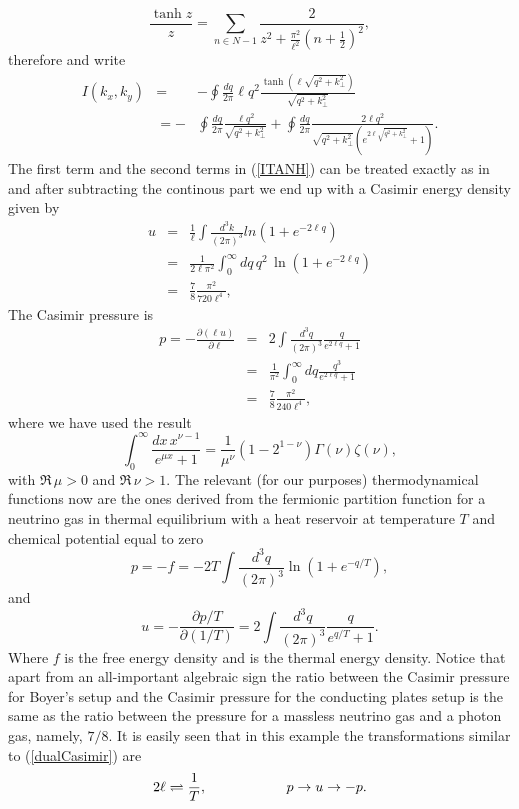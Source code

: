 \documentclass[a4paper,12pt]{article}
\begin{document}
%
\begin{equation}
\frac{\tanh z}{z}=\sum_{n\in N-1}\frac{2}{z^2+\frac{\pi^2}{\ell^2}\left(n+\frac{1}{2}\right)^2},
\end{equation}
%
therefore
%
and write
%
\begin{eqnarray}\label{ITANH}
I(k_x,k_y)& = & -\oint\frac{dq}{2\pi}\ell q^2\frac{\tanh{\left(\ell\sqrt{q^2+k_\bot^2}\right)}}{\sqrt{q^2+k_\bot^2}} \nonumber \\ 
& = -&\oint\frac{dq}{2\pi}\frac{\ell q^2}{\sqrt{q^2+k_\bot^2}}
+\oint\frac{dq}{2\pi}\frac{2\ell q^2}{\sqrt{q^2+k_\bot^2}\left(e^{2\ell\sqrt{q^2+k_\bot^2}}+1 \right)}.
\end{eqnarray}
%
The first term and the second terms in (\ref{ITANH}) can be treated exactly as in \cite{Fukushima&Ohta2001} and after subtracting the continous part we end up with a Casimir energy density given by
%
\begin{eqnarray}
u &=&\frac{1}{\ell}\int \frac{d^3k}{\left(2\pi\right)^3}ln\left(1+e^{-2\ell q}\right)\\ \nonumber
&=&\frac{1}{2\ell\pi^2}\int_0^\infty dq\,q^2\,\ln\left(1+e^{-2\ell q}\right)\\ \nonumber
&=& \frac{7}{8}\frac{\pi^2}{720\ell^4},
\end{eqnarray}
%
The Casimir pressure is
%
\begin{eqnarray}
p=-\frac{\partial\left(\ell u\right)}{\partial\ell}&=& 2\int \frac{d^3q}{\left(2\pi\right)^3}\frac{q}{e^{2\ell q}+1}\\ \nonumber
&=&\frac{1}{\pi^2}\int_0^\infty dq \frac{q^3}{e^{2\ell q}+1}\\ \nonumber
&=& \frac{7}{8}\frac{\pi^2}{240\ell^4},
\end{eqnarray}
%
where we have used the result \cite{Gradshteyn&Ryzhik94}
%
\[
\int_0^\infty\frac{dx\,x^{\nu-1}}{e^{\mu x}+1}=\frac{1}{\mu^\nu}\left(1-2^{1-\nu}\right)\Gamma\left(\nu\right)\zeta\left(\nu\right), 
\]
%
with $\Re\,\mu >0$ and $\Re\,\nu > 1$. 
The relevant (for our purposes) thermodynamical functions now are the ones derived from the fermionic partition function for a neutrino gas in thermal equilibrium with a heat reservoir at temperature $T$ and chemical potential equal to zero
%
\begin{equation}
p=-f=-2T\int \frac{d^3q}{\left(2\pi\right)^3}\ln\left(1+e^{-q/T}\right),
\end{equation}
%
and
%
\begin{equation}
u=-\frac{\partial p/T}{\partial \left(1/T\right)}=2\int \frac{d^3q}{\left(2\pi\right)^3}\frac{q}{e^{q/T}+1}.
\end{equation}
%
Where $f$ is the free energy density and is the thermal energy density. Notice that apart from an all-important algebraic sign the ratio between the Casimir pressure for Boyer's setup and the Casimir pressure for the conducting plates setup is the same as the ratio between the pressure for a massless neutrino gas and a photon gas, namely, $7/8$. It is easily seen that in this example the transformations similar to (\ref{dualCasimir}) are
%
\begin{equation}\label{dualBoyer}
2\ell\rightleftharpoons \frac{1}{T}, \hskip 2cm p\to u\to -p.
\end{equation}
%
\end{document}
